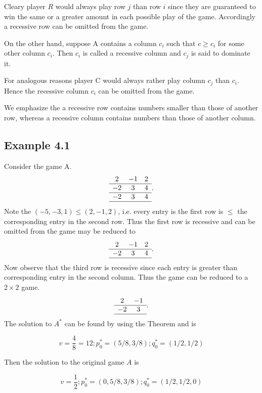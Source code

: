 \documentclass[]{report}
\begin{document}
Cleary player $R$ would always play row $j$ than row $i$ since they are guaranteed to win the same or a greater amount in each possible play of the game. Accordingly a recessive row can be omitted from the game.

On the other hand, suppose A contains a column $c_i$ such that $c \geq c_i$ for some other column $c_i$. Then $c_i$ is called
a recessive column and $c_j$ is said to dominate it.

For analogous reasons player C would always rather play column $c_j$ than $c_i$. Hence the recessive column $c_i$ can be
omitted from the game.

We emphasize the a recessive row contains numbers smaller than those of another
row, whereas a recessive column contains numbers than those of another column.
\subsection{Example 4.1}
Consider the game A.
\[
\begin{array}{ccc}
2 & -1 & 2 \\ \hline
-2 & 3 & 4 \\ \hline
-2 & 3 & 4 \\ \hline
\end{array}.
\]
Note the $(-5,-3,1) \leq (2,-1,2)$, i.e. every entry is the first row is $\leq$ the corresponding entry in
the second row. Thus the first row is recessive and can be omitted from the game may be reduced to 
\[
\begin{array}{ccc}
2 & -1 & 2 \\ \hline
-2 & 3 & 4 \\ \hline
\end{array}.
\]
Now observe that the third row is recessive since each entry is greater than corresponding entry in the second column.
Thus the game can be reduced to a $2 \times 2$ game.
\[
\begin{array}{cc}
2 & -1  \\ \hline
-2 & 3 \\ \hline
\end{array}.
\]
The solution to $A^{\ast}$ can be found by using the Theorem and is

\[ v = \frac{4}{8} = {1}{2} ; p^{\ast}_{0} =(5/8,3/8); q^{\ast}_{0} =(1/2,1/2) \]

Then the solution to the original game $A$ is


\[ v= \frac{1}{2} ; p^{\ast}_{0} =(0,5/8,3/8); q^{\ast}_{0} =(1/2,1/2,0) \]
\end{document}

